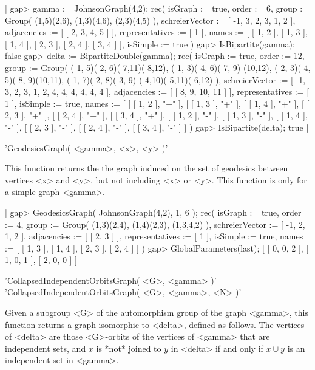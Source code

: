 |    gap> gamma := JohnsonGraph(4,2);
    rec(
      isGraph := true,
      order := 6,
      group := Group( (1,5)(2,6), (1,3)(4,6), (2,3)(4,5) ),
      schreierVector := [ -1, 3, 2, 3, 1, 2 ],
      adjacencies := [ [ 2, 3, 4, 5 ] ],
      representatives := [ 1 ],
      names := [ [ 1, 2 ], [ 1, 3 ], [ 1, 4 ], [ 2, 3 ], [ 2, 4 ],
          [ 3, 4 ] ],
      isSimple := true )
    gap> IsBipartite(gamma);
    false
    gap> delta := BipartiteDouble(gamma);
    rec(
      isGraph := true,
      order := 12,
      group := Group( ( 1, 5)( 2, 6)( 7,11)( 8,12), ( 1, 3)( 4, 6)( 7, 9)
        (10,12), ( 2, 3)( 4, 5)( 8, 9)(10,11), ( 1, 7)( 2, 8)( 3, 9)
        ( 4,10)( 5,11)( 6,12) ),
      schreierVector := [ -1, 3, 2, 3, 1, 2, 4, 4, 4, 4, 4, 4 ],
      adjacencies := [ [ 8, 9, 10, 11 ] ],
      representatives := [ 1 ],
      isSimple := true,
      names := [ [ [ 1, 2 ], "+" ], [ [ 1, 3 ], "+" ], [ [ 1, 4 ], "+" ],
          [ [ 2, 3 ], "+" ], [ [ 2, 4 ], "+" ], [ [ 3, 4 ], "+" ],
          [ [ 1, 2 ], "-" ], [ [ 1, 3 ], "-" ], [ [ 1, 4 ], "-" ],
          [ [ 2, 3 ], "-" ], [ [ 2, 4 ], "-" ], [ [ 3, 4 ], "-" ] ] )
    gap> IsBipartite(delta);
    true |


'GeodesicsGraph( <gamma>, <x>, <y> )'

This  function  returns the  the  graph induced  on the  set of geodesics
between vertices  <x> and  <y>,  but  not  including  <x>  or  <y>.  This
function is only for a simple graph <gamma>.

|    gap> GeodesicsGraph( JohnsonGraph(4,2), 1, 6 );
    rec(
      isGraph := true,
      order := 4,
      group := Group( (1,3)(2,4), (1,4)(2,3), (1,3,4,2) ),
      schreierVector := [ -1, 2, 1, 2 ],
      adjacencies := [ [ 2, 3 ] ],
      representatives := [ 1 ],
      isSimple := true,
      names := [ [ 1, 3 ], [ 1, 4 ], [ 2, 3 ], [ 2, 4 ] ] )
    gap> GlobalParameters(last);
    [ [ 0, 0, 2 ], [ 1, 0, 1 ], [ 2, 0, 0 ] ] |


'CollapsedIndependentOrbitsGraph( <G>, <gamma> )' \\
'CollapsedIndependentOrbitsGraph( <G>, <gamma>, <N> )'

Given a subgroup <G> of the automorphism group of the graph <gamma>, this
function returns a graph isomorphic to  <delta>, defined as follows.  The
vertices of <delta> are those <G>-orbits of  the vertices of <gamma> that
are independent sets,  and  $x$ is *not* joined to $y$ in <delta>  if and
only if $x\cup y$ is an independent set in <gamma>.

